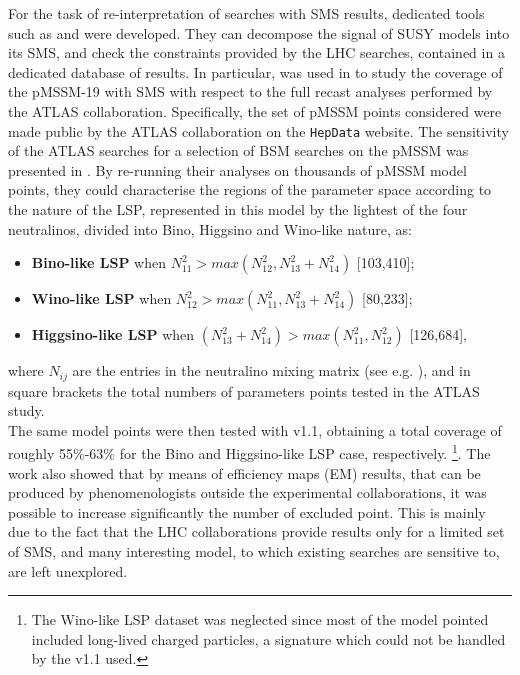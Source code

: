 \documentclass[epj,nopacs,fleqn]{svjour}
\begin{document}
  For the task of re-interpretation of searches with SMS results, 
dedicated tools such as \FASTLIM\cite{Papucci:2014rja} and \SMO\cite{Kraml:2014sna} were developed. They can decompose the signal of SUSY models into its SMS, and check the constraints provided by the LHC searches, contained in a dedicated database of results. In particular, \SMO was used in \cite{Ambrogi:2017lov} to study the coverage of the pMSSM-19 with SMS with respect to the full recast analyses performed by the ATLAS collaboration. Specifically, the set of pMSSM points considered were made public by the ATLAS collaboration on the \texttt{HepData} website\cite{ATLASpMSSMhepdata}. The sensitivity of the ATLAS searches for a selection of BSM searches on the pMSSM was presented in \cite{2015baa}. By re-running their analyses on thousands of pMSSM model points, they could characterise the  regions of the parameter space according to the nature of the LSP, represented in this model by the lightest of the four neutralinos, divided into Bino, Higgsino and Wino-like nature, as:
\begin{itemize}
	\item \textbf{Bino-like LSP} when $N_{11}^2 > max(N^2_{12},N^2_{13} + N^2_{14})$ [103,410]; \
	\item \textbf{Wino-like LSP} when $N_{12}^2 > max(N^2_{11},N^2_{13} + N^2_{14})$ [80,233]; \
	\item \textbf{Higgsino-like LSP} when $(N_{13}^2 + N_{14}^2 )  > max(N^2_{11},N^2_{12})$ [126,684],\
\end{itemize}
where $N_{ij}$ are the entries in the neutralino mixing matrix (see e.g. \cite{}), and in square brackets the total numbers of parameters points tested in the ATLAS study. 
\\
The same model points were then tested with \SMO v1.1\cite{Ambrogi:2017neo}, obtaining a total coverage of roughly 55$\%$-63$\%$ for the Bino and Higgsino-like LSP case, respectively. \footnote{The Wino-like LSP dataset was neglected since most of the model pointed included long-lived charged particles, a signature which could not be handled by the v1.1 used.}. The work also showed that by means of efficiency maps (EM) results, that can be produced by phenomenologists outside the experimental collaborations, it was possible to increase significantly the number of excluded point. This is mainly due to the fact that the LHC collaborations provide results only for a limited set of SMS, and many interesting model, to which existing searches are sensitive to, are left unexplored.
\\
\end{document}
